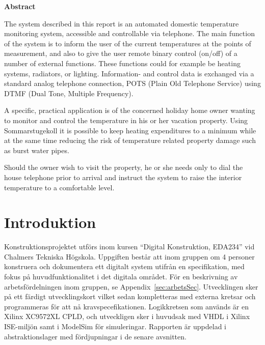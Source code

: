 \documentclass[a4paper,11pt]{article}
\begin{document}
\begin{center}
	{\noindent \bf Abstract}
\end{center}

	The system described in this report is an automated domestic temperature monitoring system, accessible and controllable via
	telephone. The main function of the system is to inform the user of the current temperatures
	at the points of measurement, and also to give the user remote binary control (on/off) of a number of external
	functions. These functions could for example be heating systems, radiators, or lighting. Information- and control data
	is exchanged via a standard analog telephone connection, POTS (Plain Old Telephone Service) using DTMF (Dual Tone, Multiple Frequency).

	A specific, practical application is of the concerned holiday home owner wanting to monitor and control the temperature 
	in his or her vacation property. Using Sommarstugekoll it is possible to keep heating expenditures to a minimum while at 
	the same time reducing the risk of temperature related property damage such as burst water pipes.

	Should the owner wish to visit the property, he or she needs only to dial the house telephone prior to arrival and instruct the system to raise
	the interior temperature to a comfortable level. 

\pagebreak

\newpage
\thispagestyle{empty}
\mbox{}
\pagebreak

 \thispagestyle{empty}
	\tableofcontents
 \thispagestyle{empty}

\pagebreak

\setcounter{page}{1}
\section{Introduktion}

	Konstruktionsprojektet utförs inom kursen ``Digital Konstruktion, EDA234'' vid Chalmers Tekniska Högskola. Uppgiften består att inom gruppen om 4 personer konstruera och dokumentera
	ett digitalt system utifrån en specifikation, med fokus på huvudfunktionalitet i det digitala området. För en beskrivning av arbetsfördelningen inom gruppen, se Appendix~\ref{sec:arbetsSec}. Utvecklingen sker på ett färdigt utvecklingskort vilket sedan kompletteras med externa kretsar och programmeras för att nå kravspecefikationen. Logikkretsen som används är en Xilinx XC9572XL CPLD, och utveckligen sker i huvudsak med VHDL i Xilinx ISE-miljön samt i ModelSim för simuleringar. Rapporten är uppdelad i abstraktionslager med fördjupningar i de senare avsnitten. 
\end{document}
